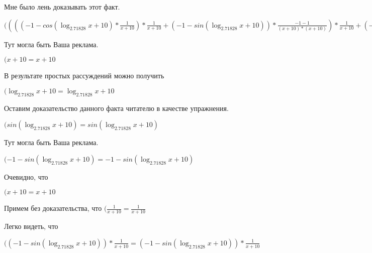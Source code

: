 \documentclass[12pt,a4paper,fleqn]{article}
\theoremstyle{definition}
\begin{document}
Мне было лень доказывать этот факт.

$(((( -1  - cos(\log_{ 2.71828 }{ x  +  10 }) * \frac{ 1 }{ x  +  10 }
) * \frac{ 1 }{ x  +  10 }
 + ( -1  - sin(\log_{ 2.71828 }{ x  +  10 })) * \frac{ -1  -  1 }{( x  +  10 ) * ( x  +  10 )}
) * \frac{ 1 }{ x  +  10 }
 + ( -1  - sin(\log_{ 2.71828 }{ x  +  10 })) * \frac{ 1 }{ x  +  10 }
 * \frac{ -1  -  1 }{( x  +  10 ) * ( x  +  10 )}
 + ( -1  - sin(\log_{ 2.71828 }{ x  +  10 })) * \frac{ 1 }{ x  +  10 }
 * \frac{ -2 }{( x  +  10 ) * ( x  +  10 )}
 + cos(\log_{ 2.71828 }{ x  +  10 }) * \frac{ -1  -  -2  * ( x  +  10  +  x  +  10 )}{( x  +  10 ) * ( x  +  10 ) * ( x  +  10 ) * ( x  +  10 )}
) * { 3 }^{sin(\log_{ 2.71828 }{ x  +  10 })} = ((( -1  - cos(\log_{ 2.71828 }{ x  +  10 }) * \frac{ 1 }{ x  +  10 }
) * \frac{ 1 }{ x  +  10 }
 + ( -1  - sin(\log_{ 2.71828 }{ x  +  10 })) * \frac{ -1  -  1 }{( x  +  10 ) * ( x  +  10 )}
) * \frac{ 1 }{ x  +  10 }
 + ( -1  - sin(\log_{ 2.71828 }{ x  +  10 })) * \frac{ 1 }{ x  +  10 }
 * \frac{ -1  -  1 }{( x  +  10 ) * ( x  +  10 )}
 + ( -1  - sin(\log_{ 2.71828 }{ x  +  10 })) * \frac{ 1 }{ x  +  10 }
 * \frac{ -2 }{( x  +  10 ) * ( x  +  10 )}
 + cos(\log_{ 2.71828 }{ x  +  10 }) * \frac{ -1  -  -2  * ( x  +  10  +  x  +  10 )}{( x  +  10 ) * ( x  +  10 ) * ( x  +  10 ) * ( x  +  10 )}
) * { 3 }^{sin(\log_{ 2.71828 }{ x  +  10 })}$

Тут могла быть Ваша реклама.

$( x  +  10  =  x  +  10 $

В результате простых рассуждений можно получить

$(\log_{ 2.71828 }{ x  +  10 } = \log_{ 2.71828 }{ x  +  10 }$

Оставим доказательство данного факта читателю в качестве упражнения.

$(sin(\log_{ 2.71828 }{ x  +  10 }) = sin(\log_{ 2.71828 }{ x  +  10 })$

Тут могла быть Ваша реклама.

$( -1  - sin(\log_{ 2.71828 }{ x  +  10 }) =  -1  - sin(\log_{ 2.71828 }{ x  +  10 })$

Очевидно, что

$( x  +  10  =  x  +  10 $

Примем без доказательства, что
$(\frac{ 1 }{ x  +  10 }
 = \frac{ 1 }{ x  +  10 }
$

Легко видеть, что

$(( -1  - sin(\log_{ 2.71828 }{ x  +  10 })) * \frac{ 1 }{ x  +  10 }
 = ( -1  - sin(\log_{ 2.71828 }{ x  +  10 })) * \frac{ 1 }{ x  +  10 }
$
\end{document}
